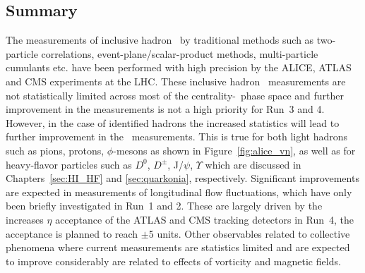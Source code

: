 \subsection{Summary}
The measurements of inclusive hadron \vn\ by traditional methods such as 
  two-particle correlations, event-plane/scalar-product methods, 
  multi-particle cumulants etc. have been performed with high precision 
  by the ALICE, ATLAS and CMS experiments at the LHC.
These inclusive hadron \vn\ measurements are not statistically limited 
  across most of the centrality-\pt\ phase space and further improvement 
  in the measurements is not a high priority for Run~3 and 4.
However, in the case of identified hadrons the increased statistics 
  will lead to further improvement in the \vn\ measurements.
This is true for both light hadrons such as pions, protons, $\phi$-mesons 
  as shown in Figure~\ref{fig:alice_vn}, as well as for heavy-flavor 
  particles such as $D^0$, $D^{\pm}$, J/$\psi$, $\Upsilon$ which are 
  discussed in Chapters~\ref{sec:HI_HF} and \ref{sec:quarkonia}, respectively.
Significant improvements are expected in measurements of 
  longitudinal flow fluctuations, which have only been briefly investigated
  in Run~1 and 2.
These are largely driven by the increases $\eta$ acceptance of the
  ATLAS and CMS tracking detectors in Run~4, the acceptance is planned 
  to reach $\pm$5 units.
Other observables related to collective phenomena where current 
  measurements are statistics limited and are expected to improve 
  considerably are related to effects of vorticity and magnetic fields.

